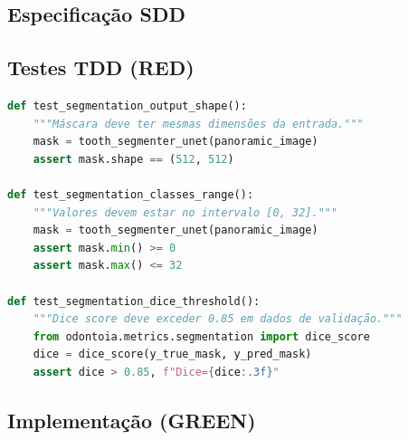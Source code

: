 \subsection{Especificação SDD}


\subsection{Testes TDD (RED)}

\begin{lstlisting}[language=Python, caption=Projeto 2 — Testes RED para segmentador dental]
def test_segmentation_output_shape():
    """Máscara deve ter mesmas dimensões da entrada."""
    mask = tooth_segmenter_unet(panoramic_image)
    assert mask.shape == (512, 512)

def test_segmentation_classes_range():
    """Valores devem estar no intervalo [0, 32]."""
    mask = tooth_segmenter_unet(panoramic_image)
    assert mask.min() >= 0
    assert mask.max() <= 32

def test_segmentation_dice_threshold():
    """Dice score deve exceder 0.85 em dados de validação."""
    from odontoia.metrics.segmentation import dice_score
    dice = dice_score(y_true_mask, y_pred_mask)
    assert dice > 0.85, f"Dice={dice:.3f}"
\end{lstlisting}

\subsection{Implementação (GREEN)}

